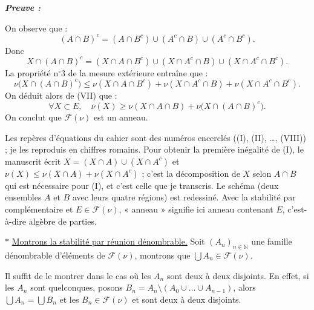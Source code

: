 \documentclass[11pt,a4paper]{article}
\newcommand{\N}{\mathbb{N}}
\newcommand{\Ff}{\mathscr{F}}
\newenvironment{preuve}{\par\textit{\textbf{Preuve :}}\par\nopagebreak[4]}{\par}
\begin{document}
\begin{preuve}
\begin{center}
\end{center}

On observe que :
\[
  (A\cap B)^c=(A\cap B^c)\cup(A^c\cap B)\cup(A^c\cap B^c).
\]
Donc
\[
  X\cap(A\cap B)^c=(X\cap A\cap B^c)\cup(X\cap A^c\cap B)\cup(X\cap A^c\cap B^c).
\]
La propriété n$^\circ$3 de la mesure extérieure entraîne que :
\[
  \nu\bigl(X\cap(A\cap B)^c\bigr)\le\nu(X\cap A\cap B^c)+\nu(X\cap A^c\cap B)+\nu(X\cap A^c\cap B^c).
\]
On déduit alors de (VII) que :
\[
  \forall X\subset E,\quad \nu(X)\ge\nu(X\cap A\cap B)+\nu\bigl(X\cap(A\cap B)^c\bigr).
\]
On conclut que $\Ff(\nu)$ est un anneau.

\begin{note}
Les repères d'équations du cahier sont des numéros encerclés ((I), (II), \dots, (VIII)) ; je les reproduis en chiffres romains.
Pour obtenir la première inégalité de (I), le manuscrit écrit $X=(X\cap A)\cup(X\cap A^c)$ et $\nu(X)\le\nu(X\cap A)+\nu(X\cap A^c)$ ;
c'est la décomposition de $X$ selon $A\cap B$ qui est nécessaire pour (I), et c'est celle que je transcris.
Le schéma (deux ensembles $A$ et $B$ avec leurs quatre régions) est redessiné.
Avec la stabilité par complémentaire et $E\in\Ff(\nu)$, « anneau » signifie ici anneau contenant $E$, c'est-à-dire algèbre de parties.
\end{note}

$\ast$ \underline{Montrons la stabilité par réunion dénombrable.}
Soit $(A_n)_{n\in\N}$ une famille dénombrable d'éléments de $\Ff(\nu)$, montrons que $\bigcup A_n\in\Ff(\nu)$.

Il suffit de le montrer dans le cas où les $A_n$ sont deux à deux disjoints. En effet, si les $A_n$ sont quelconques, posons
$B_n=A_n\setminus(A_0\cup\dots\cup A_{n-1})$, alors $\bigcup A_n=\bigcup B_n$ et les $B_n\in\Ff(\nu)$ et sont deux à deux disjoints.


\end{preuve}
\end{document}
